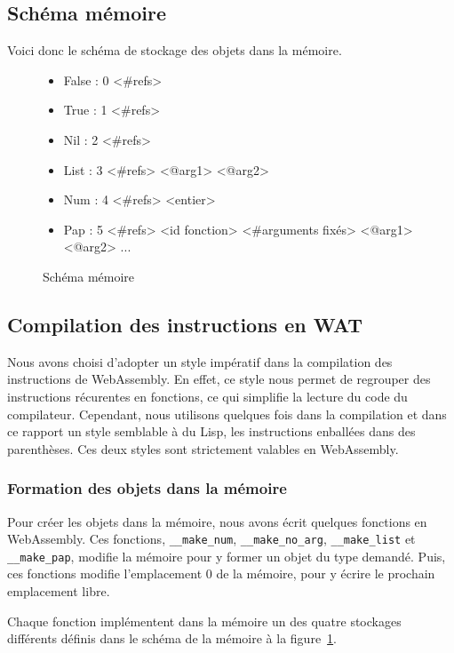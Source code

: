\documentclass{rapportECL}
\begin{document}
\subsection{Schéma mémoire}

Voici donc le schéma de stockage des objets dans la mémoire.


\begin{figure}[H]
	\begin{itemize}
		\item False : 0 <\#refs>
		\item True  : 1 <\#refs>
		\item Nil   : 2 <\#refs>
		\item List  : 3 <\#refs> <@arg1> <@arg2>
		\item Num   : 4 <\#refs> <entier>
		\item Pap   : 5 <\#refs> <id fonction> <\#arguments fixés> <@arg1> <@arg2> ...
	\end{itemize}
	\caption{Schéma mémoire}
	\label{listing:memory_wasm}
\end{figure}

\subsection{Compilation des instructions en WAT}

Nous avons choisi d'adopter un style impératif dans la compilation des instructions de WebAssembly. En effet, ce style nous permet 
de regrouper des instructions récurentes en fonctions, ce qui simplifie la lecture du code du compilateur. Cependant, nous utilisons
quelques fois dans la compilation et dans ce rapport un style semblable à du Lisp, les instructions enballées dans des parenthèses.
Ces deux styles sont strictement valables en WebAssembly.

\subsubsection{Formation des objets dans la mémoire}

Pour créer les objets dans la mémoire, nous avons écrit quelques fonctions en WebAssembly.
Ces fonctions, \verb|__make_num|, \verb|__make_no_arg|, \verb|__make_list| et \verb|__make_pap|, modifie la mémoire
pour y former un objet du type demandé. Puis, ces fonctions modifie l'emplacement 0 de la mémoire, pour y écrire le
prochain emplacement libre. 

Chaque fonction implémentent dans la mémoire un des quatre stockages différents définis dans le schéma de la 
mémoire à la figure~\ref{listing:memory_wasm}.
\end{document}
